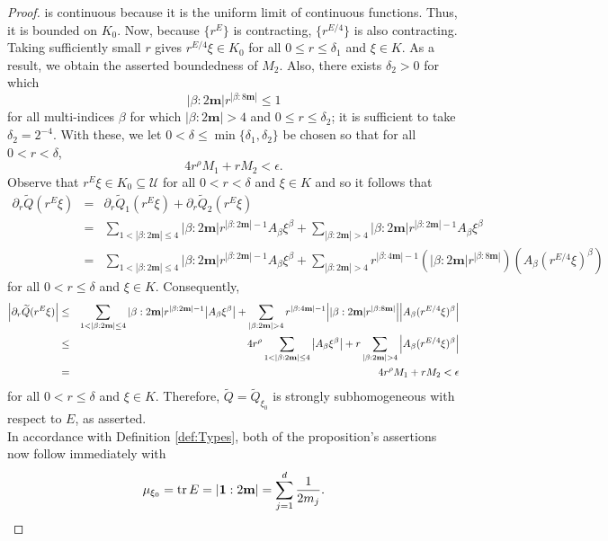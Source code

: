 \documentclass[11pt]{article}
\theoremstyle{remark}
\begin{document}
\begin{proof}
is continuous because it is the uniform limit of continuous functions. Thus, it is bounded on $K_0$. Now, because $\{r^E\}$ is contracting, $\{ r^{E/4} \}$ is also contracting. Taking sufficiently small $r$ gives $r^{E/4}\xi \in K_0$ for all $0 \leq r \leq \delta_1$ and $\xi \in K$. As a result, we obtain the asserted boundedness of $M_2$. Also, there exists $\delta_2>0$ for which
\begin{equation*}
    |\beta:2\mathbf{m}|r^{|\beta:8\mathbf{m}|}\leq 1
\end{equation*}
for all multi-indices $\beta$ for which $|\beta:2\mathbf{m}|> 4$ and $0\leq r\leq \delta_2$; it is sufficient to take $\delta_2 = 2^{-4}$. With these, we let $0<\delta\leq\min\{\delta_1,\delta_2\}$ be chosen so that for all $0 < r < \delta$,
\begin{equation*}
    4r^\rho M_1+r M_2<\epsilon. 
\end{equation*}
Observe that $r^{E}\xi\in K_0\subseteq\mathcal{U}$ for all $0<r<\delta$ and $\xi\in K$ and so it follows that
\begin{eqnarray*}
    \partial_r\widetilde{Q}(r^E\xi)&=&\partial_r\widetilde{Q}_1(r^E\xi)+\partial_r\widetilde{Q}_2(r^E\xi)\\
    &=&\sum_{1<|\beta:2\mathbf{m}|\leq 4}|\beta:2\mathbf{m}|r^{|\beta:2\mathbf{m}|-1}A_\beta\xi^\beta+\sum_{|\beta:2\mathbf{m}|> 4}|\beta:2\mathbf{m}|r^{|\beta:2\mathbf{m}|-1}A_\beta\xi^\beta\\
    &=&\sum_{1<|\beta:2\mathbf{m}|\leq 4}|\beta:2\mathbf{m}|r^{|\beta:2\mathbf{m}|-1}A_\beta\xi^\beta+\sum_{|\beta:2\mathbf{m}|>4} r^{|\beta:4\mathbf{m}|-1}\left(|\beta:2\mathbf{m}|r^{|\beta:8\mathbf{m}|}\right)\left(A_\beta (r^{E/4}\xi)^\beta\right)
\end{eqnarray*}
for all $0<r\leq\delta$ and $\xi\in K$. Consequently,
\begin{eqnarray*}
    \abs{\partial_r\widetilde{Q}(r^E\xi)}&\leq & \sum_{1<|\beta:2\mathbf{m}|\leq 4}|\beta:2\mathbf{m}|r^{|\beta:2\mathbf{m}|-1}\abs{A_\beta\xi^\beta}+\sum_{|\beta:2\mathbf{m}|>4}r^{|\beta:4\mathbf{m}|-1}\abs{|\beta:2\mathbf{m}|r^{|\beta:8\mathbf{m}|}}\abs{A_\beta (r^{E/4}\xi)^\beta}\\
    &\leq&4 r^\rho \sum_{1<|\beta:2\mathbf{m}|\leq 4}\abs{A_\beta \xi^\beta}+r\sum_{|\beta:2\mathbf{m}|>4}\abs{A_\beta(r^{E/4}\xi)^\beta}\\
    &=&4 r^\rho M_1+rM_2<\epsilon
\end{eqnarray*}
for all $0<r\leq\delta$ and $\xi\in K$. Therefore, $\widetilde{Q}=\widetilde{Q}_{\xi_0}$ is strongly subhomogeneous with respect to $E$, as asserted. \\

\noindent In accordance with Definition \ref{def:Types}, both of the proposition's assertions now follow immediately with
\begin{equation*}
    \mu_{\xi_0}=\tr E=|\mathbf{1}:2\mathbf{m}|=\sum_{j=1}^d\frac{1}{2m_j}.
\end{equation*}




\end{proof}
\end{document}
